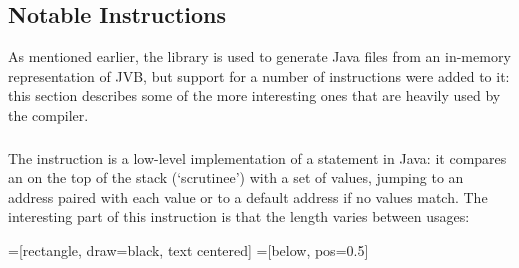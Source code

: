 \documentclass[dissertation.tex]{subfiles}
\begin{document}
{{\begin{itemize}
{        }
        \end{itemize}

    }
    \subsection{Notable Instructions}
    {

        As mentioned earlier, the  library is used to generate Java  files from
        an in-memory representation of JVB, but support for a number of instructions were added to it: this section
        describes some of the more interesting ones that are heavily used by the compiler.
        
        \subsubsection{}
        {
            
            The  instruction is a low-level implementation of a  statement in
            Java: it compares an  on the top of the stack (`scrutinee') with a set of values, jumping to
            an address paired with each value or to a default address if no values match. The interesting part of
            this instruction is that the length varies between usages:

            =[rectangle, draw=black, text centered]
            =[below, pos=0.5]

            \begin{figure}[h]
\end{figure}}}}
\end{document}
